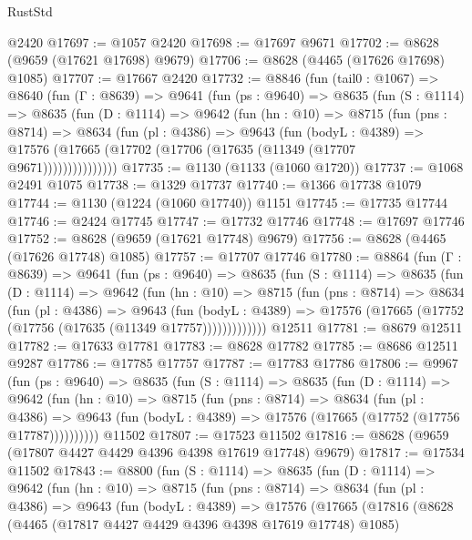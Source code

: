 \begin{lexlean}{RustStd}
\begin{coremodule}
    @2420
@17697 := @1057 @2420
@17698 := @17697 @9671
@17702 := @8628 (@9659 (@17621 @17698) @9679)
@17706 := @8628 (@4465 (@17626 @17698) @1085)
@17707 := @17667 @2420
@17732 := @8846
    (fun (tail0 : @1067) =>
    @8640
      (fun (Γ : @8639) =>
      @9641
        (fun (ps : @9640) =>
        @8635
          (fun (S : @1114) =>
          @8635
            (fun (D : @1114) =>
            @9642
              (fun (hn : @10) =>
              @8715
                (fun (pns : @8714) =>
                @8634
                  (fun (pl : @4386) =>
                  @9643
                    (fun (bodyL : @4389) =>
                    @17576 (@17665 (@17702 (@17706 (@17635 (@11349 (@17707 @9671)))))))))))))))
@17735 := @1130 (@1133 (@1060 @1720))
@17737 := @1068 @2491 @1075
@17738 := @1329 @17737
@17740 := @1366 @17738 @1079
@17744 := @1130 (@1224 (@1060 @17740)) @1151
@17745 := @17735 @17744
@17746 := @2424 @17745
@17747 := @17732 @17746
@17748 := @17697 @17746
@17752 := @8628 (@9659 (@17621 @17748) @9679)
@17756 := @8628 (@4465 (@17626 @17748) @1085)
@17757 := @17707 @17746
@17780 := @8864
    (fun (Γ : @8639) =>
    @9641
      (fun (ps : @9640) =>
      @8635
        (fun (S : @1114) =>
        @8635
          (fun (D : @1114) =>
          @9642
            (fun (hn : @10) =>
            @8715
              (fun (pns : @8714) =>
              @8634
                (fun (pl : @4386) =>
                @9643
                  (fun (bodyL : @4389) =>
                  @17576 (@17665 (@17752 (@17756 (@17635 (@11349 @17757)))))))))))))
    @12511
@17781 := @8679 @12511
@17782 := @17633 @17781
@17783 := @8628 @17782
@17785 := @8686 @12511 @9287
@17786 := @17785 @17757
@17787 := @17783 @17786
@17806 := @9967
    (fun (ps : @9640) =>
    @8635
      (fun (S : @1114) =>
      @8635
        (fun (D : @1114) =>
        @9642
          (fun (hn : @10) =>
          @8715
            (fun (pns : @8714) =>
            @8634
              (fun (pl : @4386) =>
              @9643 (fun (bodyL : @4389) => @17576 (@17665 (@17752 (@17756 @17787))))))))))
    @11502
@17807 := @17523 @11502
@17816 := @8628 (@9659 (@17807 @4427 @4429 @4396 @4398 @17619 @17748) @9679)
@17817 := @17534 @11502
@17843 := @8800
    (fun (S : @1114) =>
    @8635
      (fun (D : @1114) =>
      @9642
        (fun (hn : @10) =>
        @8715
          (fun (pns : @8714) =>
          @8634
            (fun (pl : @4386) =>
            @9643
              (fun (bodyL : @4389) =>
              @17576
                (@17665
                  (@17816
                    (@8628
                      (@4465 (@17817 @4427 @4429 @4396 @4398 @17619 @17748) @1085)

\end{coremodule}
\end{lexlean}
